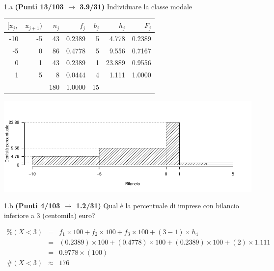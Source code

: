 \documentclass[
  11pt,
]{book}
\theoremstyle{mytheoremstyle}
\theoremstyle{mydefstyle}
\newenvironment{sol}
  {
  \begin{tcolorbox}[enhanced,breakable,arc=0.1mm,boxrule=1pt,colback=white,colframe=iblue,
  title=\bf \fontfamily{lmss}\selectfont \hspace{.5 cm} Soluzione,drop fuzzy shadow]

}{
\end{tcolorbox}
  }
\begin{document}
1.a \textbf{(Punti 13/103 \(\rightarrow\) 3.9/31)} Individuare la classe modale

\begin{sol}

\begin{table}[H]
\centering
\begin{tabular}{rrrrrrr}
\toprule
$[\text{x}_j,$ & $\text{x}_{j+1})$ & $n_j$ & $f_j$ & $b_j$ & $h_j$ & $F_j$\\
\midrule
-10 & -5 & 43 & 0.2389 & 5 & 4.778 & 0.2389\\
-5 & 0 & 86 & 0.4778 & 5 & 9.556 & 0.7167\\
0 & 1 & 43 & 0.2389 & 1 & 23.889 & 0.9556\\
1 & 5 & 8 & 0.0444 & 4 & 1.111 & 1.0000\\
 &  & 180 & 1.0000 & 15 &  & \\
\bottomrule
\end{tabular}
\end{table}

\begin{center}\includegraphics{Esami_passati_con_soluzioni_files/figure-latex/2023-204-1} \end{center}

\end{sol}

1.b \textbf{(Punti 4/103 \(\rightarrow\) 1.2/31)} Qual è la percentuale di imprese con bilancio inferiore a 3 (centomila) euro?

\begin{sol}
\begin{eqnarray*}
     \%(X< 3 ) &=&  f_{ 1 }\times 100+f_{ 2 }\times 100+f_{ 3 }\times 100 +( 3 - 1 )\times h_{ 4 } \\
              &=&  ( 0.2389 )\times 100+( 0.4778 )\times 100+( 0.2389 )\times 100 +( 2 )\times  1.111  \\
              &=&  0.9778 \times(100) \\
     \#(X< 3 ) &\approx& 176 
         \end{eqnarray*}

\end{sol}
\end{document}
